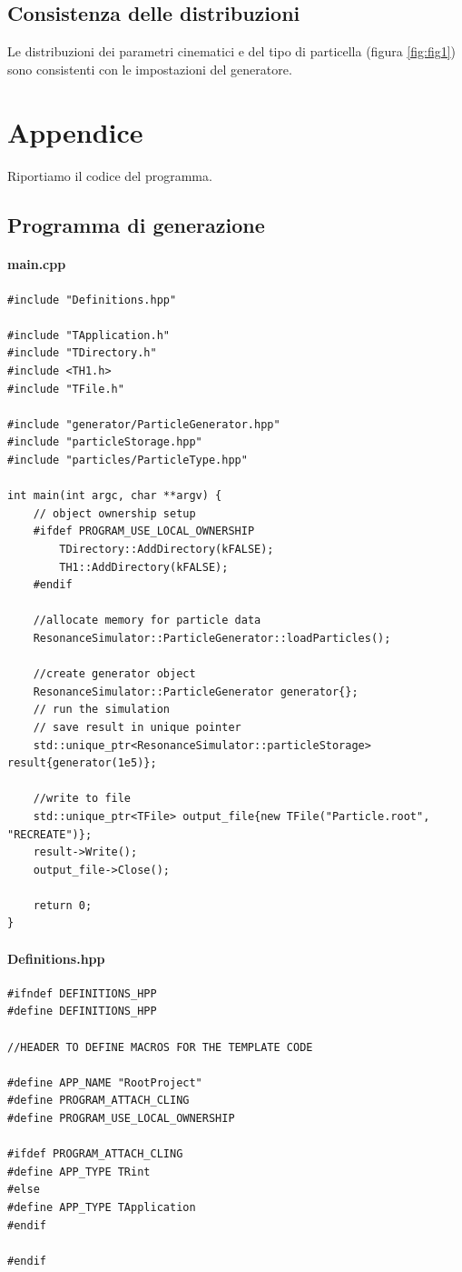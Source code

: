 \documentclass[12pt, a4paper]{article}
\begin{document}
\subsection{Consistenza delle distribuzioni}
Le distribuzioni dei parametri cinematici e del tipo di particella (figura \ref{fig:fig1}) sono consistenti con le impostazioni del generatore.


\section{Appendice}

Riportiamo il codice del programma.

\subsection{Programma di generazione}

\paragraph{main.cpp}

\begin{verbatim}
#include "Definitions.hpp"

#include "TApplication.h"
#include "TDirectory.h"
#include <TH1.h>
#include "TFile.h"

#include "generator/ParticleGenerator.hpp"
#include "particleStorage.hpp"
#include "particles/ParticleType.hpp"

int main(int argc, char **argv) {
    // object ownership setup
    #ifdef PROGRAM_USE_LOCAL_OWNERSHIP
        TDirectory::AddDirectory(kFALSE);
        TH1::AddDirectory(kFALSE);
    #endif

    //allocate memory for particle data
    ResonanceSimulator::ParticleGenerator::loadParticles();

    //create generator object
    ResonanceSimulator::ParticleGenerator generator{};
    // run the simulation
    // save result in unique pointer
    std::unique_ptr<ResonanceSimulator::particleStorage> result{generator(1e5)};

    //write to file
    std::unique_ptr<TFile> output_file{new TFile("Particle.root", "RECREATE")};
    result->Write();
    output_file->Close();

    return 0;
}
\end{verbatim}

\paragraph{Definitions.hpp}
\begin{verbatim}
#ifndef DEFINITIONS_HPP
#define DEFINITIONS_HPP

//HEADER TO DEFINE MACROS FOR THE TEMPLATE CODE

#define APP_NAME "RootProject"
#define PROGRAM_ATTACH_CLING
#define PROGRAM_USE_LOCAL_OWNERSHIP

#ifdef PROGRAM_ATTACH_CLING
#define APP_TYPE TRint
#else
#define APP_TYPE TApplication
#endif

#endif
\end{verbatim}
\end{document}
